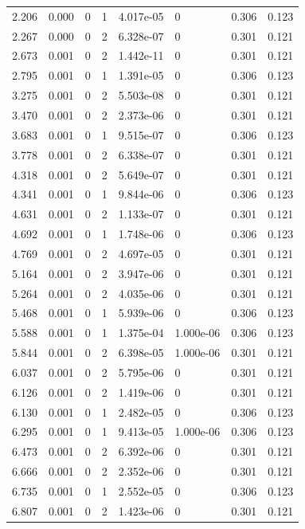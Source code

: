 \documentclass[preview]{standalone}
\begin{document}
{{\begin{tabular}{L{1.2cm}C{1.2cm} C{0.3cm}C{0.5cm} C{1.4cm}C{1.4cm} C{1.4cm}C{1.4cm}}
  2.206  &  0.000  & 0     &  1 &  4.017e-05  & 0  & 0.306 &  0.123   \\ 
  2.267  &  0.000  & 0     &  2 &  6.328e-07  & 0  & 0.301 &  0.121   \\ 
  2.673  &  0.001  & 0     &  2 &  1.442e-11  & 0  & 0.301 &  0.121   \\ 
  2.795  &  0.001  & 0     &  1 &  1.391e-05  & 0  & 0.306 &  0.123   \\ 
  3.275  &  0.001  & 0     &  2 &  5.503e-08  & 0  & 0.301 &  0.121   \\ 
  3.470  &  0.001  & 0     &  2 &  2.373e-06  & 0  & 0.301 &  0.121   \\ 
  3.683  &  0.001  & 0     &  1 &  9.515e-07  & 0  & 0.306 &  0.123   \\ 
  3.778  &  0.001  & 0     &  2 &  6.338e-07  & 0  & 0.301 &  0.121   \\ 
  4.318  &  0.001  & 0     &  2 &  5.649e-07  & 0  & 0.301 &  0.121   \\ 
  4.341  &  0.001  & 0     &  1 &  9.844e-06  & 0  & 0.306 &  0.123   \\ 
  4.631  &  0.001  & 0     &  2 &  1.133e-07  & 0  & 0.301 &  0.121   \\ 
  4.692  &  0.001  & 0     &  1 &  1.748e-06  & 0  & 0.306 &  0.123   \\ 
  4.769  &  0.001  & 0     &  2 &  4.697e-05  & 0  & 0.301 &  0.121   \\ 
  5.164  &  0.001  & 0     &  2 &  3.947e-06  & 0  & 0.301 &  0.121   \\ 
  5.264  &  0.001  & 0     &  2 &  4.035e-06  & 0  & 0.301 &  0.121   \\ 
  5.468  &  0.001  & 0     &  1 &  5.939e-06  & 0  & 0.306 &  0.123   \\ 
  5.588  &  0.001  & 0     &  1 &  1.375e-04  & 1.000e-06  & 0.306 &  0.123   \\ 
  5.844  &  0.001  & 0     &  2 &  6.398e-05  & 1.000e-06  & 0.301 &  0.121   \\ 
  6.037  &  0.001  & 0     &  2 &  5.795e-06  & 0  & 0.301 &  0.121   \\ 
  6.126  &  0.001  & 0     &  2 &  1.419e-06  & 0  & 0.301 &  0.121   \\ 
  6.130  &  0.001  & 0     &  1 &  2.482e-05  & 0  & 0.306 &  0.123   \\ 
  6.295  &  0.001  & 0     &  1 &  9.413e-05  & 1.000e-06  & 0.306 &  0.123   \\ 
  6.473  &  0.001  & 0     &  2 &  6.392e-06  & 0  & 0.301 &  0.121   \\ 
  6.666  &  0.001  & 0     &  2 &  2.352e-06  & 0  & 0.301 &  0.121   \\ 
  6.735  &  0.001  & 0     &  1 &  2.552e-05  & 0  & 0.306 &  0.123   \\ 
  6.807  &  0.001  & 0     &  2 &  1.423e-06  & 0  & 0.301 &  0.121   \\ 
\hline 
\end{tabular} 

}}
\end{document}
